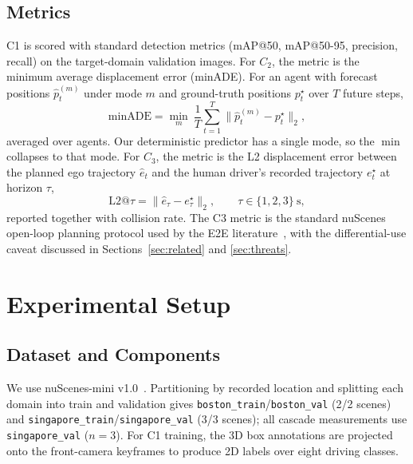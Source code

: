 \documentclass[conference]{IEEEtran}
\begin{document}
\subsection{Metrics}
C1 is scored with standard detection metrics (mAP@50, mAP@50-95, precision,
recall) on the target-domain validation images. For $C_2$, the metric is the
minimum average displacement error (minADE). For an agent with forecast
positions $\hat{p}^{(m)}_{t}$ under mode $m$ and ground-truth positions
$p^{\star}_{t}$ over $T$ future steps,
\begin{equation}
\mathrm{minADE} = \min_{m}\ \frac{1}{T}\sum_{t=1}^{T}
\bigl\lVert \hat{p}^{(m)}_{t} - p^{\star}_{t} \bigr\rVert_2 ,
\label{eq:minade}
\end{equation}
averaged over agents. Our deterministic predictor has a single mode, so the
$\min$ collapses to that mode. For $C_3$, the metric is the L2 displacement
error between the planned ego trajectory $\hat{e}_t$ and the human driver's
recorded trajectory $e^{\star}_t$ at horizon $\tau$,
\begin{equation}
\mathrm{L2}@\tau = \bigl\lVert \hat{e}_{\tau} - e^{\star}_{\tau} \bigr\rVert_2 ,
\qquad \tau \in \{1,2,3\}\ \text{s},
\label{eq:l2}
\end{equation}
reported together with collision rate. The C3 metric is the standard nuScenes
open-loop planning protocol used by the E2E
literature~\cite{hu2023uniad,jiang2023vad,zhai2023rethinking}, with the
differential-use caveat discussed in Sections~\ref{sec:related} and
\ref{sec:threats}.

\section{Experimental Setup}
\label{sec:setup}

\subsection{Dataset and Components}
We use nuScenes-mini v1.0~\cite{caesar2020nuscenes}. Partitioning by recorded
location and splitting each domain into train and validation gives
\texttt{boston\_train}/\texttt{boston\_val} (2/2 scenes) and
\texttt{singapore\_train}/\texttt{singapore\_val} (3/3 scenes); all cascade
measurements use \texttt{singapore\_val} ($n=3$). For C1 training, the 3D box
annotations are projected onto the front-camera keyframes to produce 2D labels
over eight driving classes.
\end{document}
